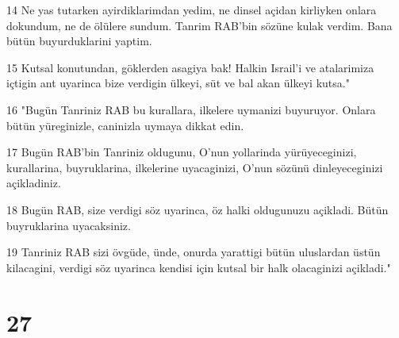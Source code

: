 \par 14 Ne yas tutarken ayirdiklarimdan yedim, ne dinsel açidan kirliyken onlara dokundum, ne de ölülere sundum. Tanrim RAB'bin sözüne kulak verdim. Bana bütün buyurduklarini yaptim.
\par 15 Kutsal konutundan, göklerden asagiya bak! Halkin Israil'i ve atalarimiza içtigin ant uyarinca bize verdigin ülkeyi, süt ve bal akan ülkeyi kutsa."
\par 16 "Bugün Tanriniz RAB bu kurallara, ilkelere uymanizi buyuruyor. Onlara bütün yüreginizle, caninizla uymaya dikkat edin.
\par 17 Bugün RAB'bin Tanriniz oldugunu, O'nun yollarinda yürüyeceginizi, kurallarina, buyruklarina, ilkelerine uyacaginizi, O'nun sözünü dinleyeceginizi açikladiniz.
\par 18 Bugün RAB, size verdigi söz uyarinca, öz halki oldugunuzu açikladi. Bütün buyruklarina uyacaksiniz.
\par 19 Tanriniz RAB sizi övgüde, ünde, onurda yarattigi bütün uluslardan üstün kilacagini, verdigi söz uyarinca kendisi için kutsal bir halk olacaginizi açikladi."

\chapter{27}


